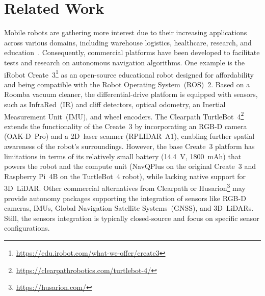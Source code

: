 \documentclass[letterpaper,10pt,conference]{IEEEtran} %
\newcommand\etal{\emph{et~al.}}
\begin{document}



\section{Related Work}\label{sec:related}


Mobile robots are gathering more interest due to their increasing applications
across various domains, including warehouse logistics, healthcare,
research, and education~\cite{alatise2020access}.
Consequently, commercial platforms have been developed to facilitate
tests and research on autonomous navigation algorithms. One example is the
iRobot Create~3\footnote{\url{https://edu.irobot.com/what-we-offer/create3}}
as an open-source educational robot designed for affordability and
being compatible with the Robot Operating System~(ROS)~2.
Based on a Roomba vacuum cleaner,
the differential-drive platform is equipped with sensors,
such as InfraRed~(IR) and cliff detectors, optical odometry,
an Inertial Measurement Unit~(IMU), and wheel encoders.
The Clearpath TurtleBot~4\footnote{\url{https://clearpathrobotics.com/turtlebot-4/}}
extends the functionality of the Create~3 by incorporating
an RGB-D camera (OAK-D~Pro) and a 2D~laser scanner (RPLIDAR~A1),
enabling further spatial awareness of the robot's surroundings.
However, the base Create~3 platform has limitations in terms of its
relatively small battery (14.4~V, 1800~mAh) that powers the robot and
the compute unit (NavQPlus on the original Create~3 and
Raspberry Pi~4B on the TurtleBot~4 robot),
while lacking native support for 3D~LiDAR.
Other commercial alternatives from Clearpath or
Husarion\footnote{\url{https://husarion.com/}}
may provide autonomy packages supporting the integration of sensors like
RGB-D cameras, IMUs, Global Navigation Satellite Systems~(GNSS), and 3D~LiDARs.
Still, the sensors integration is typically closed-source
and focus on specific sensor configurations.
\end{document}
